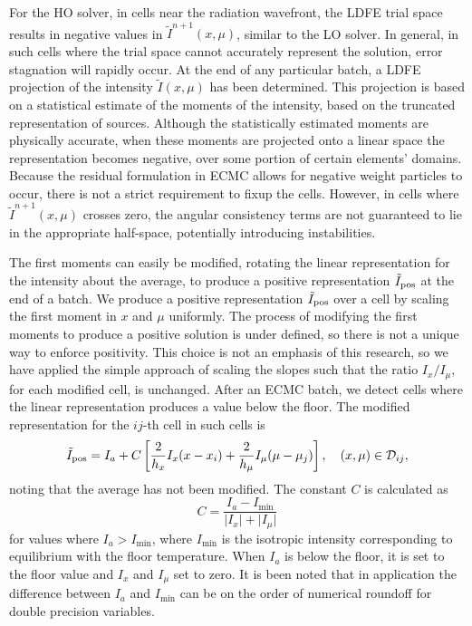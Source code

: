 For the HO solver, in cells near the radiation wavefront, the LDFE trial space results in
negative values in $\tilde{I}^{n+1}(x,\mu)$, similar to the LO solver.  In general, in
such cells where the trial space cannot accurately represent the solution, error
stagnation will rapidly occur.  At the end of any particular batch, a LDFE projection of
the intensity $\tilde I(x,\mu)$ has been determined.  This projection is based on a
statistical estimate of the moments of the intensity, based on the truncated
representation of sources.  Although the statistically estimated moments are physically
accurate, when these moments are projected onto a linear space the representation becomes
negative, over some portion of certain elements' domains.  Because the residual
formulation in ECMC allows for negative weight particles to occur, there is not a strict
requirement to fixup the cells.  However, in cells where $\tilde{I}^{n+1}(x,\mu)$ crosses
zero, the angular consistency terms are not guaranteed to lie in the appropriate
half-space, potentially introducing instabilities.  

The first moments can easily be modified, rotating the linear representation for the intensity
about the average, to produce a positive representation $\tilde
I_{{\text{pos}}}$ at the end of a batch.  We produce a positive representation $\tilde
I_{\text{{\text{pos}}}}$ over a cell by scaling the first moment in $x$ and $\mu$ uniformly.  The
process of modifying the first moments to produce a positive solution is under defined, so
there is not a unique way to enforce positivity.  This choice is not an emphasis of this
research, so we have applied the simple approach of scaling the slopes such that
the ratio $I_x/I_\mu$, for each modified cell, is unchanged.  After an ECMC batch, we
detect cells where the linear representation produces a value below the floor.    The
modified representation for the $ij$-th cell in such cells is
\begin{equation}
    \tilde I_{{\text{pos}}} = I_{a} + C\left[\frac{2}{h_x}I_x(x-x_i) +
    \frac{2}{h_\mu}I_\mu(\mu-\mu_j)\right],\quad     (x,\mu) \in \mathcal{D}_{ij},
\end{equation}
noting that the average has not been modified.
The constant $C$ is calculated as
\begin{equation}
    C =  \frac{I_{a} - I_{\min}}{\lvert I_x \rvert + \lvert I_\mu \rvert}
\end{equation}
for values where $I_{a} > I_{\min}$, where $I_{\min}$ is the isotropic intensity
corresponding to equilibrium with the floor temperature.  When $I_a$ is below the floor, it is set to
the floor value and $I_x$ and $I_\mu$ set to zero.  It is been noted that in application
the difference between $I_{a}$ and $I_{\min}$ can be on the order of numerical roundoff for
double precision variables.

